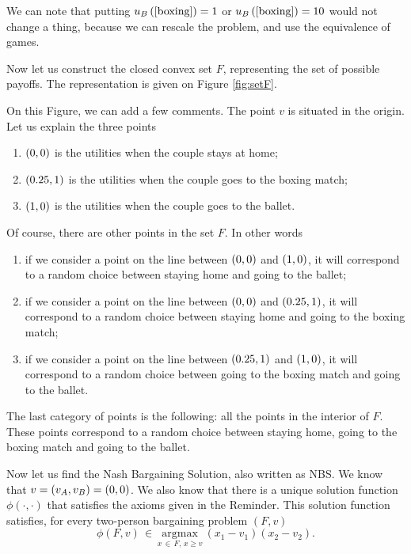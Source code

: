 \begin{enumerate} [label=\alph*.]
We can note that putting $u_{B} \left(\left[\text{boxing}\right]\right) = 1$ or $u_{B} \left(\left[\text{boxing}\right]\right) = 10$ would not change a thing, because we can rescale the problem, and use the equivalence of games.

Now let us construct the closed convex set $F$, representing the set of possible payoffs. The representation is given on Figure \ref{fig:setF}.


	
	On this Figure, we can add a few comments. The point $v$ is situated in the origin. Let us explain the three points
	\begin{enumerate}
	    \item $\left(0,0\right)$ is the utilities when the couple stays at home;
	    \item $\left(0.25,1\right)$ is the utilities when the couple goes to the boxing match;
	    \item $\left(1,0\right)$ is the utilities when the couple goes to the ballet.
	\end{enumerate}
	
	Of course, there are other points in the set $F$. In other words
	\begin{enumerate}
	    \item if we consider a point on the line between $\left(0,0\right)$ and $\left(1,0\right)$, it will correspond to a random choice between staying home and going to the ballet;
	    \item if we consider a point on the line between $\left(0,0\right)$ and $\left(0.25,1\right)$, it will correspond to a random choice between staying home and going to the boxing match;
	    \item if we consider a point on the line between $\left(0.25,1\right)$ and $\left(1,0\right)$, it will correspond to a random choice between going to the boxing match and going to the ballet.
	\end{enumerate}
	
	The last category of points is the following: all the points in the interior of $F$. These points correspond to a random choice between staying home, going to the boxing match and going to the ballet.
	
	\vspace{5mm}
	
	Now let us find the Nash Bargaining Solution, also written as NBS. We know that $v = \left(v_{A}, v_{B}\right) = \left(0, 0\right)$. We also know that there is a unique solution function $\phi(\cdot, \cdot)$ that satisfies the axioms given in the Reminder. This solution function satisfies, for every two-person bargaining problem $(F, v)$
	\begin{equation*}
		\phi(F, v) \, \in \, \underset{x \, \in \, F, \, x \geq v}{\mathrm{argmax}} \ (x_1 - v_1)(x_2 - v_2).
	\end{equation*}
	

\end{enumerate}
